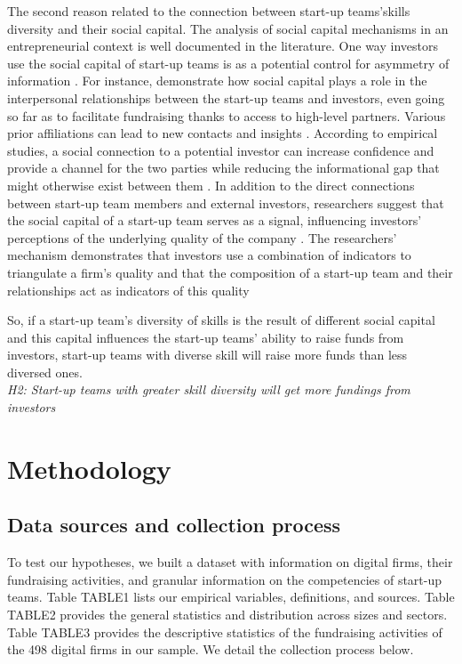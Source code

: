 \documentclass[12pt]{article}
\begin{document}
The second reason related to the connection between start-up teams'skills diversity and their social capital. The analysis of social capital mechanisms in an entrepreneurial context is well documented in the literature. One way investors use the social capital of start-up teams is as a potential control for asymmetry of information \citep{ko2018signaling}. For instance, \citet{shane2002network} demonstrate how social capital plays a role in the interpersonal relationships between the start-up teams and investors, even going so far as to facilitate fundraising thanks to access to high-level partners. Various prior affiliations can lead to new contacts and insights \citep{beckman2007early}. According to empirical studies, a social connection to a potential investor can increase confidence and provide a channel for the two parties while reducing the informational gap that might otherwise exist between them \citep{huang2017resources, shane2002network, shane2002organizational}. In addition to the direct connections between start-up team members and external investors, researchers suggest that the social capital of a start-up team serves as a signal, influencing investors' perceptions of the underlying quality of the company \citep{hoenig2015quality, shane2002organizational}. The researchers' mechanism demonstrates that investors use a combination of indicators to triangulate a firm's quality and that the composition of a start-up team and their relationships act as indicators of this quality \citep{plummer2016better, semrau2014exactly}

So, if a start-up team's diversity of skills is the result of different social capital and this capital influences the start-up teams' ability to raise funds from investors, start-up teams with diverse skill will raise more funds than less diversed ones. \\

\noindent \textit{H2: Start-up teams with greater skill diversity will get more fundings from investors}

\section{Methodology}

\subsection{Data sources and collection process}

To test our hypotheses, we built a dataset with information on digital firms, their fundraising activities, and granular information on the competencies of start-up teams. Table TABLE1 lists our empirical variables, definitions, and sources. Table TABLE2 provides the general statistics and distribution across sizes and sectors. Table TABLE3 provides the descriptive statistics of the fundraising activities of the 498 digital firms in our sample. We detail the collection process below. \\
\end{document}
